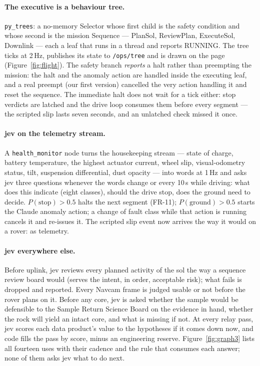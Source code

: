 \documentclass[11pt]{article}
\begin{document}
\paragraph{The executive is a behaviour tree.} \texttt{py\_trees}: a no-memory Selector whose first child is the safety condition and whose second is the mission Sequence --- PlanSol, ReviewPlan, ExecuteSol, Downlink --- each a leaf that runs in a thread and reports RUNNING. The tree ticks at 2\,Hz, publishes its state to \texttt{/ops/tree} and is drawn on the page (Figure~\ref{fig:flight}). The safety branch \emph{reports} a halt rather than preempting the mission: the halt and the anomaly action are handled inside the executing leaf, and a real preempt (our first version) cancelled the very action handling it and reset the sequence. The immediate halt does not wait for a tick either: stop verdicts are latched and the drive loop consumes them before every segment --- the scripted slip lasts seven seconds, and an unlatched check missed it once.

\paragraph{jev on the telemetry stream.} A \texttt{health\_monitor} node turns the housekeeping stream --- state of charge, battery temperature, the highest actuator current, wheel slip, visual-odometry status, tilt, suspension differential, dust opacity --- into words at 1\,Hz and asks jev three questions whenever the words change or every 10\,s while driving: what does this indicate (eight classes), should the drive stop, does the ground need to decide. $P(\text{stop})>0.5$ halts the next segment (FR-11); $P(\text{ground})>0.5$ starts the Claude anomaly action; a change of fault class while that action is running cancels it and re-issues it. The scripted slip event now arrives the way it would on a rover: as telemetry.

\paragraph{jev everywhere else.} Before uplink, jev reviews every planned activity of the sol the way a sequence review board would (serves the intent, in order, acceptable risk); what fails is dropped and reported. Every Navcam frame is judged usable or not before the rover plans on it. Before any core, jev is asked whether the sample would be defensible to the Sample Return Science Board on the evidence in hand, whether the rock will yield an intact core, and what is missing if not. At every relay pass, jev scores each data product's value to the hypotheses if it comes down now, and code fills the pass by score, minus an engineering reserve. Figure~\ref{fig:graph3} lists all fourteen uses with their cadence and the rule that consumes each answer; none of them asks jev what to do next.
\end{document}
